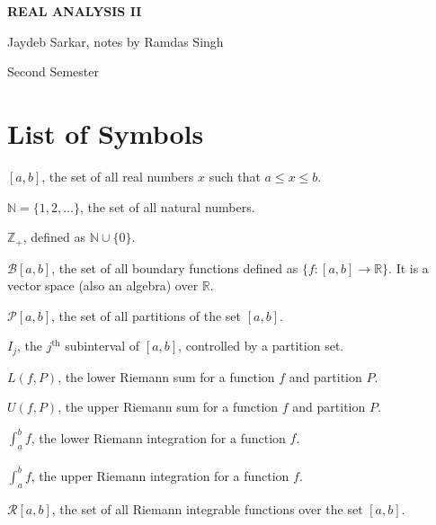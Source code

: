 \documentclass[15pt,a4paper]{book}
\theoremstyle{definition}
\begin{document}
\pagestyle{empty}

\begin{titlepage}
    \begin{center}
    \vspace*{\fill}
    {\Huge \textbf{\MakeUppercase{Real Analysis II}}\par}

    \vspace{0.5cm} %
    {\Large Jaydeb Sarkar, notes by Ramdas Singh\par}

    \vspace{0.5cm} %
    {\large Second Semester\par}
    \vspace*{\fill}
    \end{center}
\end{titlepage}

\clearpage


\chapter*{List of Symbols}
\begin{notationlist}
    \item $[a,b]$, the set of all real numbers $x$ such that $a \leq x \leq b$.
    \item $\mathbb{N} = \{1,2,\ldots\}$, the set of all natural numbers.
    \item $\mathbb{Z}_{+}$, defined as $\mathbb{N} \cup \{0\}$.
    \item $\mathcal{B}[a,b]$, the set of all boundary functions defined as $\{f:[a,b] \to \mathbb{R}\}$. It is a vector space (also an algebra) over $\mathbb{R}$.
    \item $\mathcal{P}[a,b]$, the set of all partitions of the set $[a,b]$.
    \item $I_{j}$, the $j^{\text{th}}$ subinterval of $[a,b]$, controlled by a partition set.
    \item $L(f,P)$, the lower Riemann sum for a function $f$ and partition $P$.
    \item $U(f,P)$, the upper Riemann sum for a function $f$ and partition $P$.
    \item $\int_{\underline{a}}^{b} f$, the lower Riemann integration for a function $f$.
    \item $\int_{a}^{\overline{b}} f$, the upper Riemann integration for a function $f$.
    \item $\mathcal{R}[a,b]$, the set of all Riemann integrable functions over the set $[a,b]$.
\end{notationlist}
\end{document}
